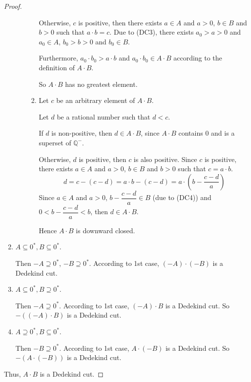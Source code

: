 \begin{proof}
\begin{enumerate}[label={\textbf{Case \arabic*.}},itemindent={0.5cm}]
\begin{enumerate}
\begin{enumerate}[label = (\roman*)]
                                  Otherwise, $c$ is positive, then there exists $a\in A$ and $a > 0$, $b\in B$ and $b > 0$ such that $a\cdot b = c$. Due to (DC3), there exists $a_{0} > a > 0$ and $a_{0}\in A$, $b_{0} > b > 0$ and $b_{0}\in B$.

                                  Furthermore, $a_{0}\cdot b_{0} > a\cdot b$ and $a_{0}\cdot b_{0}\in A\cdot B$ according to the definition of $A\cdot B$.

                                  So $A\cdot B$ has no greatest element.
                            \item Let $c$ be an arbitrary element of $A\cdot B$.

                                  Let $d$ be a rational number such that $d < c$.

                                  If $d$ is non-positive, then $d\in A\cdot B$, since $A\cdot B$ contains $0$ and is a superset of $\mathbb{Q}^{-}$.

                                  Otherwise, $d$ is positive, then $c$ is also positive. Since $c$ is positive, there exists $a\in A$ and $a > 0$, $b\in B$ and $b > 0$ such that $c = a\cdot b$.
                                  \[
                                      d = c - (c - d) = a\cdot b - (c - d) = a\cdot\left(b - \frac{c - d}{a}\right)
                                  \]
                                  Since $a\in A$ and $a > 0$, $b - \dfrac{c - d}{a}\in B$ (due to (DC4)) and $0 < b - \dfrac{c - d}{a} < b$, then $d \in A\cdot B$.

                                  Hence $A\cdot B$ is downward closed.
                        \end{enumerate}
              \end{enumerate}
        \item $A\subseteq {0}^{*}, B\subseteq {0}^{*}$.

              Then $-A\supseteq {0}^{*}$, $-B\supseteq {0}^{*}$. According to 1st case, $(-A)\cdot (-B)$ is a Dedekind cut.
        \item $A\subseteq {0}^{*}, B\supseteq {0}^{*}$.

              Then $-A\supseteq {0}^{*}$. According to 1st case, $(-A)\cdot B$ is a Dedekind cut. So $-((-A)\cdot B)$ is a Dedekind cut.
        \item $A\supseteq {0}^{*}, B\subseteq {0}^{*}$.

              Then $-B\supseteq {0}^{*}$. According to 1st case, $A\cdot (-B)$ is a Dedekind cut. So $-(A\cdot (-B))$ is a Dedekind cut.
    \end{enumerate}

    Thus, $A\cdot B$ is a Dedekind cut.
\end{proof}

